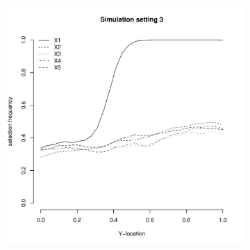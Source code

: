 \documentclass[authoryear, review, 11pt]{elsarticle}
\begin{document}
\begin{figure}
\begin{subfigure}[b]{0.3\textwidth}
			\label{fig:tiger}
		\end{subfigure}
        ~ %
		\begin{subfigure}[b]{0.3\textwidth}
			\centering
			\includegraphics[width=\textwidth]{../../figures/simulation/28-3-profile-selection.pdf}
			\label{fig:mouse}
		\end{subfigure}
	\end{figure}
	
\end{document}
